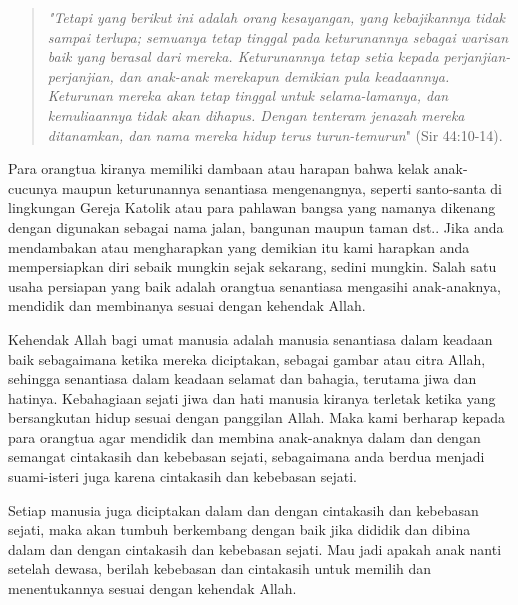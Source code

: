 \documentclass[a5paper,headsepline,titlepage,12pt,nnormalheadings,DIVcalc]{scrbook}
\begin{document}
\begin{quote}
\textit{"Tetapi yang berikut ini adalah orang kesayangan, yang kebajikannya tidak sampai terlupa; semuanya tetap tinggal pada keturunannya sebagai warisan baik yang berasal dari mereka. Keturunannya tetap setia kepada perjanjian-perjanjian, dan anak-anak merekapun demikian pula keadaannya. Keturunan mereka akan tetap tinggal untuk selama-lamanya, dan kemuliaannya tidak akan dihapus. Dengan tenteram jenazah mereka ditanamkan, dan nama mereka hidup terus turun-temurun}" (Sir 44:10-14). 
\end{quote}

Para orangtua kiranya memiliki dambaan atau harapan bahwa kelak anak-cucunya maupun keturunannya senantiasa mengenangnya, seperti santo-santa di lingkungan Gereja Katolik atau para pahlawan bangsa yang namanya dikenang dengan digunakan sebagai nama jalan, bangunan maupun taman dst.. Jika anda mendambakan atau mengharapkan yang demikian itu kami harapkan anda mempersiapkan diri sebaik mungkin sejak sekarang, sedini mungkin. Salah satu usaha persiapan yang baik adalah orangtua senantiasa mengasihi anak-anaknya, mendidik dan membinanya sesuai dengan kehendak Allah. 

Kehendak Allah bagi umat manusia adalah manusia senantiasa dalam keadaan baik sebagaimana ketika mereka diciptakan, sebagai gambar atau citra Allah, sehingga senantiasa dalam keadaan selamat dan bahagia, terutama jiwa dan hatinya. Kebahagiaan sejati jiwa dan hati manusia kiranya terletak ketika yang bersangkutan hidup sesuai dengan panggilan Allah. Maka kami berharap kepada para orangtua agar mendidik dan membina anak-anaknya dalam dan dengan semangat cintakasih dan kebebasan sejati, sebagaimana anda berdua menjadi suami-isteri juga karena cintakasih dan kebebasan sejati. 

Setiap manusia juga diciptakan dalam dan dengan cintakasih dan kebebasan sejati, maka akan tumbuh berkembang dengan baik jika dididik dan dibina dalam dan dengan cintakasih dan kebebasan sejati. Mau jadi apakah anak nanti setelah dewasa, berilah kebebasan dan cintakasih untuk memilih dan menentukannya sesuai dengan kehendak Allah.
\end{document}
